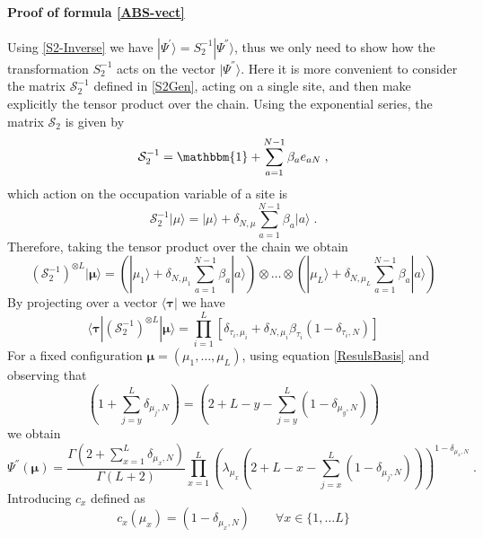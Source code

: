 \documentclass[10pt]{article}
\numberwithin{equation}{section}
\numberwithin{equation}{subsection}
\newcommand{\co}{\;,}
\newcommand{\dt}{\;.}
\begin{document}
\paragraph{Proof of formula \eqref{ABS-vect}} Using \eqref{S2-Inverse} we have $|\Psi^{'}\rangle=S_{2}^{-1}|\Psi^{''}\rangle$, thus we only need to show how the transformation $S_{2}^{-1}$ acts on the vector $|\Psi^{''}\rangle$. Here it is more convenient to consider the matrix $\mathcal{S}_{2}^{-1}$ defined in \eqref{S2Gen}, acting on a single site, and then make explicitly the tensor product over the chain. Using the exponential series, the matrix $\mathcal{S}_{2}$ is given by 
\begin{equation}
   \mathcal{S}_{2}^{-1}=\mathbbm{1}+\sum_{a=1}^{N-1}\beta_{a}e_{aN}\co
\end{equation}
which action on the occupation variable of a site is 
\begin{equation}
  \mathcal{S}_{2}^{-1} |\mu\rangle= |\mu\rangle+\delta_{N,\mu}\sum_{a=1}^{N-1}\beta_a|a\rangle\dt
\end{equation} 
Therefore, taking the tensor product over the chain we obtain 
\begin{equation}
  \left(\mathcal{S}_{2}^{-1}\right)^{\otimes L} |\bm{\mu}\rangle=\left( |\mu_1\rangle+\delta_{N,\mu_1}\sum_{a=1}^{N-1}\beta_a|a\rangle\right)\otimes\ldots\otimes \left( |\mu_L\rangle+\delta_{N,\mu_L}\sum_{a=1}^{N-1}\beta_a|a\rangle\right)
\end{equation} 
By projecting over a vector $\langle \bm{\tau}|$ we have 
\begin{equation}\label{goodTP-S2}
  \langle \bm{\tau}|\left(\mathcal{S}_{2}^{-1}\right)^{\otimes L} |\bm{\mu}\rangle=\prod_{i=1}^L\left[ \delta_{\tau_i,\mu_i}+\delta_{N,\mu_i}\beta_{\tau_i} (1-\delta_{\tau_i,N})\right]
\end{equation} 
For a fixed configuration $\bm{\mu}=(\mu_{1},\ldots,\mu_{L})$, using equation \eqref{ResulsBasis} and observing that 
\begin{equation}
	\left(1+\sum_{j=y}^{L}\delta_{\mu_{j},N}\right) =\left(2+L-y-\sum_{j=y}^{L}(1-\delta_{\mu_{y},N})\right)
\end{equation}
we obtain 
\begin{equation}
	\Psi^{''}(\bm{\mu})=\frac{\Gamma(2+\sum_{x=1}^{L}\delta_{\mu_{x},N})}{\Gamma(L+2)}\prod_{x=1}^{L}\left(\lambda_{\mu_{x}}\left(2+L-x-\sum_{j=x}^{L}(1-\delta_{\mu_{j},N})\right)\right)^{1-\delta_{\mu_{x},N}}\dt
\end{equation}
Introducing $c_{x}$ defined as 
\begin{equation}
	c_{x}(\mu_{x})=(1-\delta_{\mu_{x},N}) \qquad \forall x\in \{1,\ldots L\}
\end{equation}
\end{document}
